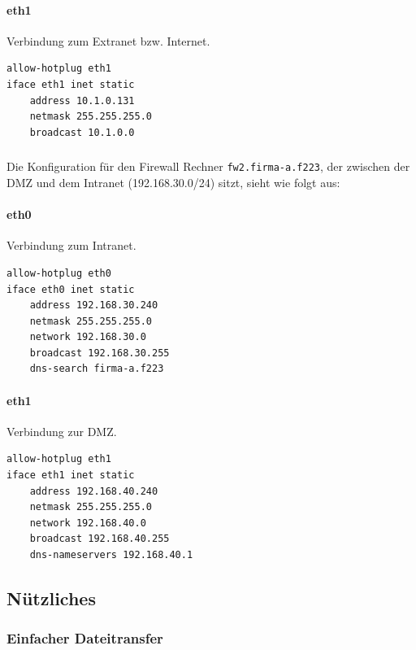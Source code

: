 \paragraph{eth1} Verbindung zum Extranet bzw. Internet.

\begin{lstlisting}[label=lst:fw1:eth1,caption={Netzwerkadapter eth1 Konfiguration.}]
allow-hotplug eth1
iface eth1 inet static
    address 10.1.0.131
    netmask 255.255.255.0
    broadcast 10.1.0.0
\end{lstlisting}


\subsubsection{\fwb}

Die Konfiguration für den Firewall Rechner {\tt fw2.firma-a.f223}, der zwischen
der DMZ und dem Intranet (192.168.30.0/24) sitzt, sieht wie folgt aus:

\paragraph{eth0} Verbindung zum Intranet.

\begin{lstlisting}[label=lst:fw2:eth0,caption={Netzwerkadapter eth0 Konfiguration.}]
allow-hotplug eth0
iface eth0 inet static
    address 192.168.30.240
    netmask 255.255.255.0
    network 192.168.30.0
    broadcast 192.168.30.255
    dns-search firma-a.f223
\end{lstlisting}

\paragraph{eth1} Verbindung zur DMZ.

\begin{lstlisting}[label=lst:fw2:eth1,caption={Netzwerkadapter eth1 Konfiguration.}]
allow-hotplug eth1
iface eth1 inet static
    address 192.168.40.240
    netmask 255.255.255.0
    network 192.168.40.0
    broadcast 192.168.40.255
    dns-nameservers 192.168.40.1
\end{lstlisting}


\subsection{Nützliches}

\subsubsection{Einfacher Dateitransfer}

